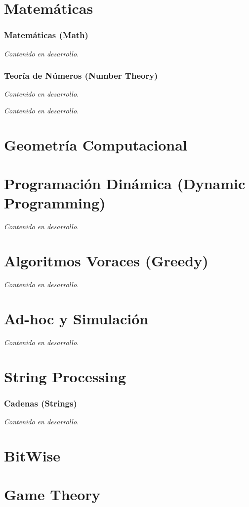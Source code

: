 \documentclass[10pt,a4paper,twocolumn]{article}
\newcommand{\pendiente}{\textit{\color{gray}Contenido en desarrollo.}\par\medskip}
\begin{document}
\part{Matemáticas}

\section{Matemáticas (Math)}
\pendiente

\section{Teoría de Números (Number Theory)}
\pendiente



\pendiente

\part{Geometría Computacional}



\part{Programación Dinámica (Dynamic Programming)}
\pendiente

\part{Algoritmos Voraces (Greedy)}
\pendiente

\part{Ad-hoc y Simulación}
\pendiente

\part{String Processing}

\section{Cadenas (Strings)}
\pendiente

\part{BitWise}

\part{Game Theory}
\end{document}
